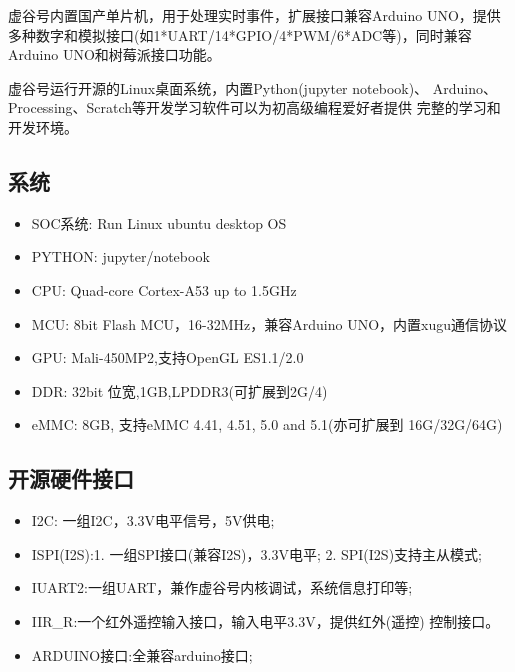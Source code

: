 \documentclass[letterpaper,10pt,english]{sphinxmanual}
\begin{document}
虚谷号内置国产单片机，用于处理实时事件，扩展接口兼容Arduino UNO，提供多种数字和模拟接口(如1*UART/14*GPIO/4*PWM/6*ADC等)，同时兼容Arduino UNO和树莓派接口功能。

虚谷号运行开源的Linux桌面系统，内置Python(jupyter notebook)、 Arduino、Processing、Scratch等开发学习软件可以为初高级编程爱好者提供 完整的学习和开发环境。


\subsection{系统}
\label{\detokenize{01.about/1.2-function:id2}}\begin{itemize}
\item {} 
SOC系统: Run Linux ubuntu desktop OS

\item {} 
PYTHON: jupyter/notebook

\item {} 
CPU: Quad-core Cortex-A53 up to 1.5GHz

\item {} 
MCU: 8bit Flash MCU，16-32MHz，兼容Arduino UNO，内置xugu通信协议

\item {} 
GPU: Mali-450MP2,支持OpenGL ES1.1/2.0

\item {} 
DDR: 32bit 位宽,1GB,LPDDR3(可扩展到2G/4)

\item {} 
eMMC: 8GB, 支持eMMC 4.41, 4.51, 5.0 and 5.1(亦可扩展到 16G/32G/64G)

\end{itemize}


\subsection{开源硬件接口}
\label{\detokenize{01.about/1.2-function:id3}}\begin{itemize}
\item {} 
I2C: 一组I2C，3.3V电平信号，5V供电;

\item {} 
ISPI(I2S):1. 一组SPI接口(兼容I2S)，3.3V电平; 2. SPI(I2S)支持主从模式;

\item {} 
IUART2:一组UART，兼作虚谷号内核调试，系统信息打印等;

\item {} 
IIR\_R:一个红外遥控输入接口，输入电平3.3V，提供红外(遥控) 控制接口。

\item {} 
ARDUINO接口:全兼容arduino接口;

\end{itemize}
\end{document}
